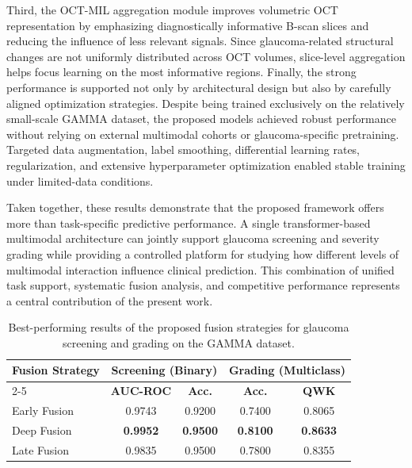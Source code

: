 \documentclass[preprint,12pt]{elsarticle}
\begin{document}
Third, the OCT-MIL aggregation module improves volumetric OCT representation by emphasizing diagnostically informative B-scan slices and reducing the influence of less relevant signals. Since glaucoma-related structural changes are not uniformly distributed across OCT volumes, slice-level aggregation helps focus learning on the most informative regions. Finally, the strong performance is supported not only by architectural design but also by carefully aligned optimization strategies. Despite being trained exclusively on the relatively small-scale GAMMA dataset, the proposed models achieved robust performance without relying on external multimodal cohorts or glaucoma-specific pretraining. Targeted data augmentation, label smoothing, differential learning rates, regularization, and extensive hyperparameter optimization enabled stable training under limited-data conditions.

Taken together, these results demonstrate that the proposed framework offers more than task-specific predictive performance. A single transformer-based multimodal architecture can jointly support glaucoma screening and severity grading while providing a controlled platform for studying how different levels of multimodal interaction influence clinical prediction. This combination of unified task support, systematic fusion analysis, and competitive performance represents a central contribution of the present work.

\begin{table}[!t]
    \centering
    \caption{Best-performing results of the proposed fusion strategies for glaucoma screening and grading on the GAMMA dataset.}
    \label{tab:summary_results}
    \scriptsize
    \setlength{\tabcolsep}{5pt}
    \begin{tabular}{lcccc}
        \hline
        \multirow{2}{*}{\textbf{Fusion Strategy}}
                     & \multicolumn{2}{c}{\textbf{Screening (Binary)}}
                     & \multicolumn{2}{c}{\textbf{Grading (Multiclass)}}                                                       \\
        \cline{2-5}
                     & \textbf{AUC-ROC}                                  & \textbf{Acc.}   & \textbf{Acc.}   & \textbf{QWK}    \\
        \hline
        Early Fusion & 0.9743                                            & 0.9200          & 0.7400          & 0.8065          \\
        Deep Fusion  & \textbf{0.9952}                                   & \textbf{0.9500} & \textbf{0.8100} & \textbf{0.8633} \\
        Late Fusion  & 0.9835                                            & 0.9500          & 0.7800          & 0.8355          \\
        \hline
    \end{tabular}
\end{table}
\end{document}
